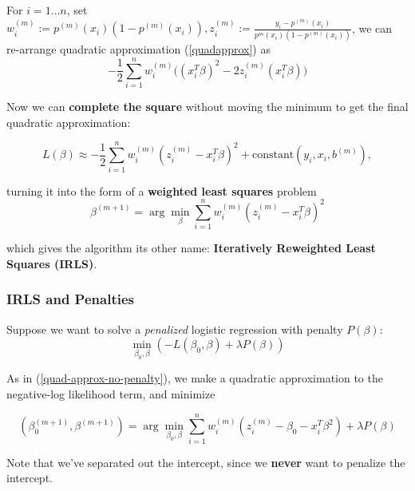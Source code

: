\documentclass[11pt]{article}
\theoremstyle{definition}
\numberwithin{equation}{section}
\begin{document}
For $i=1\dots n$, set $w_i^{(m)}:=p^{(m)}(x_i)(1-p^{(m)}(x_i)),z_i^{(m)}:=\frac{y_i-p^{(m)} (x_i)}{p^{m}(x_i)(1-p^{(m)}(x_i))}$, we can re-arrange quadratic approximation (\ref{quadapprox}) as
\begin{equation}
  -\frac{1}{2}\sum^n_{i=1}w_i^{(m)}\Bigg( (x_i^T\beta)^2-2z_i^{(m)}(x_i^T\beta) \Bigg)
\end{equation}

Now we can \textbf{complete the square} without moving the minimum to get the final quadratic approximation:

\begin{equation}
  L(\beta)\approx -\frac{1}{2}\sum^n_{i=1}w_i^{(m)}(z_i^{(m)} - x_i^T\beta)^2 + \text{constant}(y_i,x_i,b^{(m)}),
\end{equation}

turning it into the form of a \textbf{weighted least squares} problem
\begin{equation}
  \beta^{(m+1)}=\arg\min_\beta\sum^n_{i=1}w_i^{(m)}(z_i^{(m)}-x_i^T\beta)^2
\end{equation}

which gives the algorithm its other name: \textbf{Iteratively Reweighted Least Squares (IRLS)}.

\subsubsection{IRLS and Penalties}


Suppose we want to solve a \textit{penalized} logistic regression with penalty $P(\beta)$:
\begin{equation}
  \min_{\beta_0,\beta}(-L(\beta_0,\beta) + \lambda P(\beta))
\end{equation}

As in (\ref{quad-approx-no-penalty}), we make a quadratic approximation to the negative-log likelihood term, and minimize

\begin{equation}
  (\beta_0^{(m+1)},\beta^{(m+1)}) = \arg\min_{\beta_0,\beta}\sum^n_{i=1}w_i^{(m)}(z_i^{(m)}-\beta_0-x_i^T\beta^2) + \lambda P(\beta)
\end{equation}
\begin{writenoes}
  Note that we've separated out the intercept, since we \textbf{never} want to penalize the intercept.
\end{writenoes}
\end{document}
